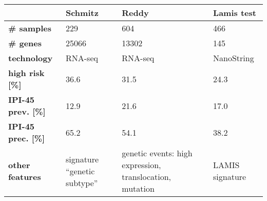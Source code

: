 \begin{table}[ht]
\small
\centering
\begin{tabular}{L{.18\textwidth}R{.2\textwidth}R{.28\textwidth}R{.18\textwidth}}
  \hline
  & \textbf{Schmitz \cite{schmitz18}} & \textbf{Reddy \cite{reddy17}} & \textbf{Lamis test \cite{staiger20}} \\
  \hline
  \textbf{\# samples} & 229 & 604 & 466 \\
  \textbf{\# genes} & 25066 & 13302 & 145 \\
  \textbf{technology} & RNA-seq & RNA-seq & NanoString \\
  \textbf{high risk [\%]} & 36.6 & 31.5\footnotemark & 24.3 \\
  \textbf{IPI-45 prev. [\%]} & 12.9 & 21.6 & 17.0 \\
  \textbf{IPI-45 prec. [\%]} & 65.2 & 54.1 & 38.2 \\
  \textbf{other features\footnotemark} & signature ``genetic subtype'' & 
    genetic events: high expression, translocation, mutation & LAMIS signature \\
  \hline
\end{tabular}
\end{table}
